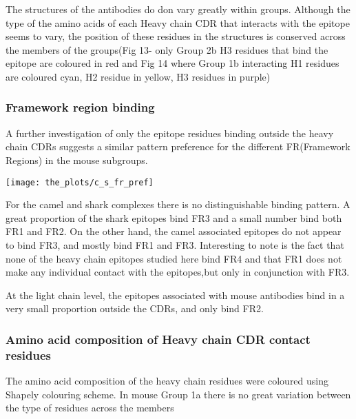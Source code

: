 \documentclass{article}
\begin{document}
The structures of the antibodies do don vary greatly within groups. Although the type of the amino acids of each Heavy chain CDR that interacts with the epitope seems to vary, the position of these residues in the structures is conserved across the members of the groups(Fig 13- only Group 2b H3 residues that bind the epitope are coloured in red and Fig 14 where Group 1b interacting  H1 residues are coloured cyan, H2 residue in yellow, H3 residues in purple)




\subsubsection{Framework region binding}

A further investigation of only the epitope residues binding outside the heavy chain CDRs suggests a similar pattern preference for the different FR(Framework Regions) in the mouse subgroups. 

\begin{center}
	\texttt{[image: the\_plots/c\_s\_fr\_pref]}
	 \label{pix:ppaa} %
\end{center}



For the camel and shark complexes there is no distinguishable binding pattern. A great proportion of the shark epitopes bind FR3 and a small number bind both FR1 and FR2. On the other hand, the camel associated epitopes do not appear to bind FR3, and mostly bind FR1 and FR3. Interesting to note is the fact that none of the heavy chain epitopes studied here bind FR4 and that FR1 does not make any individual contact with the epitopes,but only in conjunction with FR3.

\bigbreak
At the light chain level, the epitopes associated with mouse antibodies bind in a very small proportion outside the CDRs, and only bind FR2.





\bigbreak
\subsubsection{Amino acid composition of Heavy chain CDR contact residues}

The amino acid composition of the heavy chain residues were coloured using Shapely colouring scheme. In mouse Group 1a there is no great variation between the type of residues across the members
\end{document}
